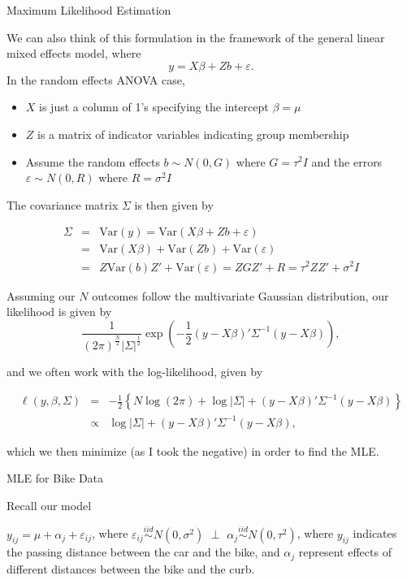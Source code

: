 \documentclass[ignorenonframetext,]{beamer}
\providecommand{\tightlist}{%
  \setlength{\itemsep}{0pt}\setlength{\parskip}{0pt}}
\begin{document}
\begin{frame}{Maximum Likelihood Estimation}

We can also think of this formulation in the framework of the general
linear mixed effects model, where \[y=X\beta+Zb+\varepsilon.\] In the
random effects ANOVA case,

\begin{itemize}
\tightlist
\item
  \(X\) is just a column of 1's specifying the intercept \(\beta=\mu\)
\item
  \(Z\) is a matrix of indicator variables indicating group membership
\item
  Assume the random effects \(b \sim N(0,G)\) where \(G=\tau^2I\) and
  the errors \(\varepsilon \sim N(0,R)\) where \(R=\sigma^2I\)
\end{itemize}

The covariance matrix \(\Sigma\) is then given by

\begin{eqnarray*}
\Sigma&=&\text{Var}(y)=\text{Var}(X\beta+Zb+\varepsilon) \\
&=& \text{Var}(X\beta)+\text{Var}(Zb)+\text{Var}(\varepsilon)  \\
&=& Z\text{Var}(b)Z' + \text{Var}(\varepsilon) = ZGZ'+R =\tau^2ZZ'+\sigma^2I
\end{eqnarray*}

\end{frame}

\begin{frame}{}

Assuming our \(N\) outcomes follow the multivariate Gaussian
distribution, our likelihood is given by
\[\frac{1}{(2\pi)^\frac{N}{2}|\Sigma|^\frac{1}{2}}\exp\left(-\frac{1}{2}(y-X\beta)'\Sigma^{-1}(y-X\beta)\right),\]

and we often work with the log-likelihood, given by

\begin{eqnarray*}
\ell(y,\beta,\Sigma)&=&-\frac{1}{2}\left\{N\log(2\pi) + \log |\Sigma| + (y-X\beta)'\Sigma^{-1}(y-X\beta)   \right\} \\
&\propto& \log |\Sigma| + (y-X\beta)'\Sigma^{-1}(y-X\beta),
\end{eqnarray*}

which we then minimize (as I took the negative) in order to find the
MLE.

\end{frame}

\begin{frame}{MLE for Bike Data}

Recall our model

\(y_{ij}=\mu+\alpha_j+\varepsilon_{ij}\), where
\(\varepsilon_{ij} \overset{iid}{\sim} N(0,\sigma^2)\) \(\perp\)
\(\alpha_j \overset{iid}{\sim} N(0,\tau^2)\), where \(y_{ij}\) indicates
the passing distance between the car and the bike, and \(\alpha_j\)
represent effects of different distances between the bike and the curb.

\end{frame}
\end{document}
